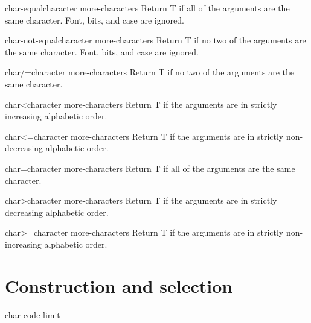 \documentclass[10pt,english]{book}
\begin{document}
\begin{function}{char-equal}{character \rest more-characters}
  Return T if all of the arguments are the same character.
  Font, bits, and case are ignored.
\end{function}

\begin{function}{char-not-equal}{character \rest more-characters}
  Return T if no two of the arguments are the same character.
   Font, bits, and case are ignored.
\end{function}

\begin{function}{char/=}{character \rest more-characters}
  Return T if no two of the arguments are the same character.
\end{function}

\begin{function}{char<}{character \rest more-characters}
  Return T if the arguments are in strictly increasing alphabetic order.
\end{function}

\begin{function}{char<=}{character \rest more-characters}
  Return T if the arguments are in strictly non-decreasing alphabetic order.
\end{function}

\begin{function}{char=}{character \rest more-characters}
  Return T if all of the arguments are the same character.
\end{function}

\begin{function}{char>}{character \rest more-characters}
  Return T if the arguments are in strictly decreasing alphabetic order.
\end{function}

\begin{function}{char>=}{character \rest more-characters}
  Return T if the arguments are in strictly non-increasing alphabetic order.
\end{function}

\section{Construction and selection}
\label{sec:character-constr-select}

\begin{constant}{char-code-limit}{}
  
\end{constant}
\end{document}
